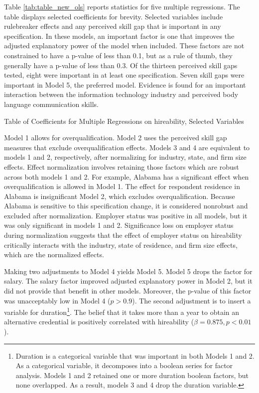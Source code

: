 \documentclass[review]{elsarticle}
\begin{document}
Table \ref{tab:table_new_ols} reports statistics for five multiple regressions.
The table displays selected coefficients for brevity.
Selected variables include rulebreaker effects and any perceived skill gap that is important in any specification.
In these models, an important factor is one that improves the adjusted explanatory power of the model when included.
These factors are not constrained to have a p-value of less than 0.1, but as a rule of thumb, they generally have a p-value of less than 0.3.
Of the thirteen perceived skill gaps tested, eight were important in at least one specification.
Seven skill gaps were important in Model 5, the preferred model.
Evidence is found for an important interaction between the information technology industry and perceived body language communication skills.

\begin{table}
    \caption{Table of Coefficients for Multiple Regressions on hireability, Selected Variables}
    \resizebox{\columnwidth}{!}{
        
    }
    \label{tab:table_new_ols}
\end{table}

Model 1 allows for overqualification.
Model 2 uses the perceived skill gap measures that exclude overqualification effects.
Models 3 and 4 are equivalent to models 1 and 2, respectively, after normalizing for industry, state, and firm size effects.
Effect normalization involves retaining those factors which are robust across both models 1 and 2.
For example, Alabama has a significant effect when overqualification is allowed in Model 1.
The effect for respondent residence in Alabama is insignificant Model 2, which excludes overqualification.
Because Alabama is sensitive to this specification change, it is considered nonrobust and excluded after normalization.
Employer status was positive in all models, but it was only significant in models 1 and 2.
Significance loss on employer status during normalization
suggests that the effect of employer status on hireability critically interacts with the industry,
state of residence, and firm size effects, which are the normalized effects.

Making two adjustments to Model 4 yields Model 5.
Model 5 drops the factor for salary.
The salary factor improved adjusted explanatory power in Model 2, but it did not provide that benefit in other models.
Moreover, the p-value of this factor was unacceptably low in Model 4 ($p > 0.9$).
The second adjustment is to insert a variable for duration\footnote{
    Duration is a categorical variable that was important in both Models 1 and 2.
    As a categorical variable, it decomposes into a boolean series for factor analysis.
    Models 1 and 2 retained one or more duration boolean factors, but none overlapped.
    As a result, models 3 and 4 drop the duration variable.
}.
The belief that it takes more than a year to obtain an alternative credential
is positively correlated with hireability ($\beta = 0.875, p < 0.01$).
\end{document}
